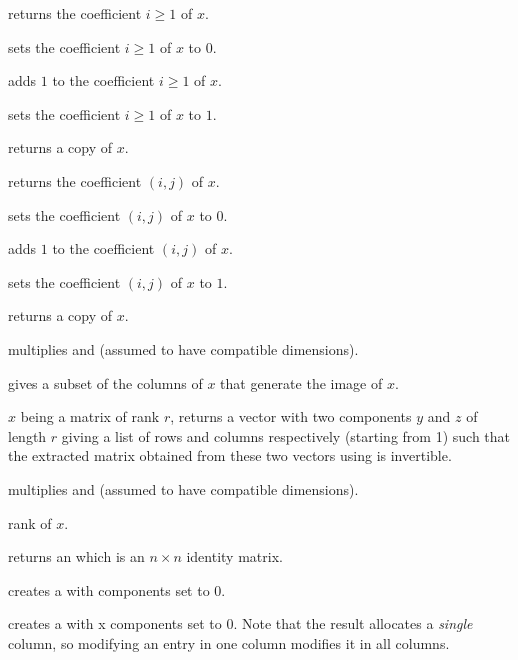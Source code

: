  returns the coefficient $i\ge 1$ of $x$.

 sets the coefficient $i\ge 1$ of $x$ to
$0$.

 adds $1$ to the coefficient $i\ge 1$ of $x$.

 sets the coefficient $i\ge 1$ of $x$ to $1$.

 returns a copy of $x$.

 returns the coefficient $(i,j)$
of $x$.

 sets the coefficient $(i,j)$ of $x$
to $0$.

 adds $1$ to the coefficient $(i,j)$
of $x$.

 sets the coefficient $(i,j)$ of $x$
to $1$.

 returns a copy of $x$.

 multiplies   and  (assumed
to have compatible dimensions).

 gives a subset of the columns of $x$ that generate
the image of $x$.


 $x$ being a matrix of rank $r$, returns a
vector with two  components $y$ and $z$ of length $r$ giving a
list of rows and columns respectively (starting from 1) such that the extracted
matrix obtained from these two vectors using is invertible.

 multiplies   and  (assumed to
have compatible dimensions).

 rank of $x$.

 returns an  which is an $n \times n$
identity matrix.

 creates a  with  components set to
$0$.

 creates a  with  x 
components set to $0$. Note that the result allocates a
\emph{single} column, so modifying an entry in one column modifies it in
all columns.

